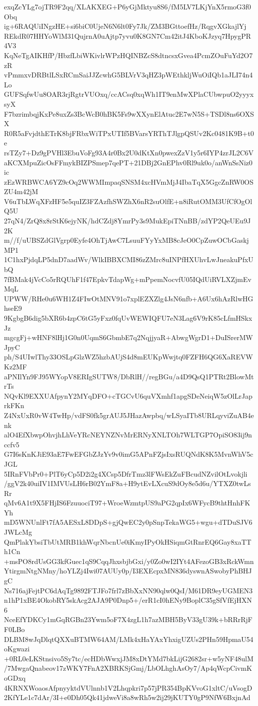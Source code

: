 exqZcYLg7ojTR9F2qq/XLAKXEG+P6yGjMktyu8S6/fM5LV7LKjYnX5rmoG3f0Obq
ig+6RAQUiINgzHE+si6biC0UjeN6N6lt0Fy7Jk/ZM3BGttoefHz/RqgvXGkajlYj
REkdR07HHYoWlM31QujrnA0uAjtp7yvu0K8GN7Cm42itJ4KboKJzyq7HpygPR4V3
KqNeTgAIKHfP/HbzfLbiWKivlrWPzHQINBZcS8dtncsxGvea4PcmZOuFuYd2O7zR
vPmmxvDRBtlLSxRCmSaiJJZcwhG5BLVrV3qHZ3pWEthkljWuOiIQb1aJLI74n4Lo
GUFSqfwUu8OAR3rjRgtrVUOxq/ccACsq0xqWh1IT9enMwXPlaCUbwpuO2yyyxsyX
F7bzrimbqjKxPe8uxZs3BcWcB0hBK5Fs9wXXynElAtuc2E7wN5S+TSDl8ns6OXSX
R0R5aFvjdthETrK8bjFRbxWiTPxUTIf5BVarsYRThTJlgpQSUv2Kc0481K9B+t0e
rsTZy7+Dz9gPVHl3EbuVoFg93A4r0Bx2U0dKtXn0pwexZzV1y5r6IYP4zrJL2C6V
aKCXMpuZicOsFFmykBIZPSmep7qePT+21DBj2GnEPhv0Rl9uk0o/anWnSsNiz0ic
zEzWRBWCA6YZ9cOq2WWMImpaqSNSM4xcHVmMjJ4IbaTqX5GgcZnRW0OSZU4m42jM
V6uTbLWqXFzHF5e5quIZ3FZAzfhSWZhX6nR2suOlfE+n8iRutOMM3UfCfOgOlQ5U
27qN4/ZrQ8x8rStK6ejyNK/hdCZdj8YmrPy3s9MukEpiTNnBB/zdYP2QeUEu9J2K
m//f/uUBSZdGlVgrp0Eyfe4OhTjAwC7LsuuFYyYxMB8cJeO0CpZuwOCbGaskjMP1
1C1hxPjdqLP5dnD7aadWv/WlkIBBXCMI86zZMrc8uINPfHXUhvLwJneakuPfxUbQ
7fBMak4jVcCo5rRQUhF1f47EpkvTdapWg+mPpemNocvfU05IQdUiRVLXZjmEvMqL
UPWW/RHe0u6WH1Z4FIwOtMNV91o7xplEZXZlg4JsN6nfb+A6Ux6hAzRlwHGhseE9
9KgbgB6dig5bXR6b4zpC6tG5yFxz0fqUvWEWIQFU7eN3Lag6V9rK85cLfmHSkxJz
mgcgFj+wHNF8lHj1G0n0UqmS6GbmbE7q2NqjjyaR+AbwgWgrD1+DuISrerMWJpyC
ph/S4UIwlThy33OSLpGlzWZ5hzbAUjS4d8mEUKpWwjtq0FZFH6QG6XaREVWKz2MF
aPNIlYn9FJ95WYopV8ERIgSUTW8/DbRlH//regBGu/a4D9QsQ1PTRt2BlowMtrTs
NQvKl9EXXUAfpynY2MYqDFO+cTGCvU6quVXmhf1apgSDeNeiqW5zOlLrJaprkFKn
Z4NxUxR0vW4TwHp/vdFS0fk5grAUJ5JHazAwpbq/wLSyaITb8URLqyviZuAB4enk
alO4EfXbwpOhvjhLhVeYRcNEYNZNvMrERNyXNLTOh7WLTGP7OpiSO83ij9nccfv5
G7I6sKnKJiE93aE7FwEFGbZJzYv9v0imG5APnFZjsIxsRUQNdK8K5MvnWhV5cJGL
5IRnFVbPr0+PlT6yCp5D2i2g4XCsp5DfrTmz3lFWsEkZuFBcudNZvilOtLvokjli
/ggV2k40uiIV1IMVUsLH6rB02YmF8a+H9ytEvLXcuS9dOy8e5d6u/YTXZ0twLsRr
qMv6A1t9X5FHjIS6FzuuociT97+WroeWzmtpUS9aPG2qpIx6WFycB9thtHnhFKYh
mD5WNUnlFt7fA5AESxL8DDpS+gjQwEC2y0pSnpTekaWG5+wgu+dTDuSJV6JWLcMg
QmPlakYbsiTbUtMRB1khWqrNbcnUe0iKmyIPyOkHSiqmGtRnrEQ6Gay8xaTTh1Cn
+msPO8rdUsGG3kfGuec1qS9CqqJhxsbjbGxi/y0Zo0wI2IYt4AFezoGB3xRckWmn
YtirgmNtgNMny/hoYLZj4Iwi07AUUy0p/I3EXEcpxMN836dyswnASwobyPhBHJgC
Ns716ajFejtPC6dAqTg9892FTJFo7frl7zBbXxNN90qlw0QsI/M61DR9eyUGMEN3
n1hP1xBE4OkobRY5skAcg2AJA9P0Dnp5+/erR1cI0hENy9BoplC35gSfVfEjHXN6
NceEfYDKCy1mGqRGBn23Ywm5oF7X4zgL1h7azMBH5ByV33gU39k+bRRrRjFF0LBo
DLBM8wJqDlqtQXXuBTMW64AM/LMk4xHaYAxYhxigUZUs2PHn59HpmaU54oKgwazi
+0RL0eLKStnsivo5Sy7tc/ecHDbWwxjJM8xDtYMd7bkLijG2682sr+w5yNF48ulM
/7MwgaQnabeov17zWKY7FnA2XBRKSjGmj/LbOLhghAsOy7/Ap4qWcpCivmKoGDxq
4KRNXWoaosAfpnyyktdVUlnnb1V2Lhqpkri7p57jPR354BpKVvoG1xltC/uVsogD
2KfYLe1c7dAr/3I+e0Dh05Qk41jdweVi8a8wRh5w2ij29jKUTY0gP9NfW6BxjnAd

